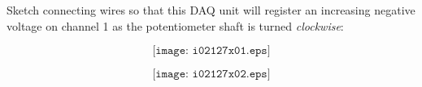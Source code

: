 

Sketch connecting wires so that this DAQ unit will register an increasing negative voltage on channel 1 as the potentiometer shaft is turned {\it clockwise}:

$$\texttt{[image: i02127x01.eps]}$$







$$\texttt{[image: i02127x02.eps]}$$











